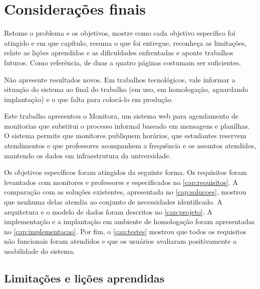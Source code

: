 \chapter{Considerações finais}
\label{cap:conclusao}

\begin{instrucao}
Retome o problema e os objetivos, mostre como cada objetivo específico foi
atingido e em que capítulo, resuma o que foi entregue, reconheça as
limitações, relate as lições aprendidas e as dificuldades enfrentadas e aponte
trabalhos futuros. Como referência, de duas a quatro páginas costumam ser
suficientes.

Não apresente resultados novos. Em trabalhos tecnológicos, vale informar a
situação do sistema ao final do trabalho (em uso, em homologação, aguardando
implantação) e o que falta para colocá-lo em produção.
\end{instrucao}

Este trabalho apresentou o Monitora, um sistema web para agendamento de
monitorias que substitui o processo informal baseado em mensagens e planilhas.
O sistema permite que monitores publiquem horários, que estudantes reservem
atendimentos e que professores acompanhem a frequência e os assuntos
atendidos, mantendo os dados em infraestrutura da universidade.

Os objetivos específicos foram atingidos da seguinte forma. Os requisitos
foram levantados com monitores e professores e especificados no
\cref{cap:requisitos}. A comparação com as soluções existentes, apresentada no
\cref{cap:solucoes}, mostrou que nenhuma delas atendia ao conjunto de
necessidades identificado. A arquitetura e o modelo de dados foram descritos
no \cref{cap:projeto}. A implementação e a implantação em ambiente de
homologação foram apresentadas no \cref{cap:implementacao}. Por fim, o \cref{cap:testes} mostrou
que todos os requisitos não funcionais foram atendidos e que os usuários
avaliaram positivamente a usabilidade do sistema.

\section{Limitações e lições aprendidas}
\label{sec:conclusao:limitacoes}

